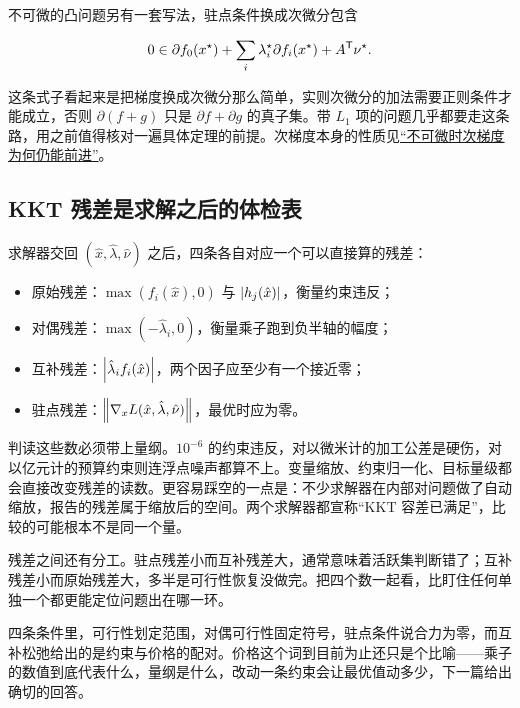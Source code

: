 不可微的凸问题另有一套写法，驻点条件换成次微分包含

\[
0\in\partial f_0(x^\star)+\sum_i\lambda_i^\star\partial f_i(x^\star)+A^{\mathsf{T}}\nu^\star.
\]

这条式子看起来是把梯度换成次微分那么简单，实则次微分的加法需要正则条件才能成立，否则 \(\partial(f+g)\) 只是 \(\partial f+\partial g\) 的真子集。带 \(L_1\) 项的问题几乎都要走这条路，用之前值得核对一遍具体定理的前提。次梯度本身的性质见\hyperref[sec:09-Convex-Optimization/06-Optimization-Algorithms/03]{``不可微时次梯度为何仍能前进''}。

\subsection{KKT 残差是求解之后的体检表}

求解器交回 \((\hat x,\hat\lambda,\hat\nu)\) 之后，四条各自对应一个可以直接算的残差：

\begin{itemize}
\tightlist
\item
  原始残差：\(\max(f_i(\hat x),0)\) 与 \(\left|h_j(\hat x)\right|\)，衡量约束违反；
\item
  对偶残差：\(\max(-\hat\lambda_i,0)\)，衡量乘子跑到负半轴的幅度；
\item
  互补残差：\(\left|\hat\lambda_i f_i(\hat x)\right|\)，两个因子应至少有一个接近零；
\item
  驻点残差：\(\left\lVert\nabla_x L(\hat x,\hat\lambda,\hat\nu)\right\rVert\)，最优时应为零。
\end{itemize}

判读这些数必须带上量纲。\(10^{-6}\) 的约束违反，对以微米计的加工公差是硬伤，对以亿元计的预算约束则连浮点噪声都算不上。变量缩放、约束归一化、目标量级都会直接改变残差的读数。更容易踩空的一点是：不少求解器在内部对问题做了自动缩放，报告的残差属于缩放后的空间。两个求解器都宣称``KKT 容差已满足''，比较的可能根本不是同一个量。

残差之间还有分工。驻点残差小而互补残差大，通常意味着活跃集判断错了；互补残差小而原始残差大，多半是可行性恢复没做完。把四个数一起看，比盯住任何单独一个都更能定位问题出在哪一环。

四条条件里，可行性划定范围，对偶可行性固定符号，驻点条件说合力为零，而互补松弛给出的是约束与价格的配对。价格这个词到目前为止还只是个比喻——乘子的数值到底代表什么，量纲是什么，改动一条约束会让最优值动多少，下一篇给出确切的回答。
